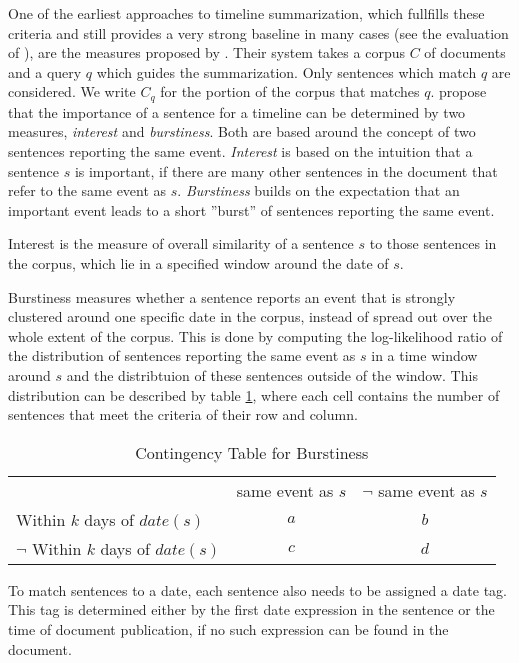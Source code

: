 \documentclass[a4paper,BCOR=10mm]{report}
\numberwithin{lemma}{chapter}
\numberwithin{definition}{chapter}
\begin{document}
One of the earliest approaches to timeline summarization, which fullfills these criteria and still provides a very strong baseline in many cases (see the evaluation of \citet{markert}), are the measures proposed by \citet{chieu}.
Their system takes a corpus $C$ of documents and a query $q$ which guides the summarization. Only sentences which match $q$ are considered. We write $C_q$ for the portion of the corpus that matches $q$.
\citeauthor{chieu} propose that the importance of a sentence for a timeline can be determined by two measures, \textit{interest} and \textit{burstiness}.
Both are based around the concept of two sentences reporting the same event. \textit{Interest} is based on the intuition that a sentence $s$ is important, if there are many other sentences in the document that refer to the same event as $s$. \textit{Burstiness} builds on the expectation that an important event leads to a short ''burst'' of sentences reporting the same event.

Interest is the measure of overall similarity of a sentence $s$ to those sentences in the corpus, which lie in a specified window around the date of $s$.

Burstiness measures whether a sentence reports an event that is strongly clustered around one specific date in the corpus, instead of spread out over the whole extent of the corpus. This is done by computing the log-likelihood ratio of the distribution of sentences reporting the same event as $s$ in a time window around $s$ and the distribtuion of these sentences outside of the window.
This distribution can be described by table \ref{tab:chieu}, where each cell contains the number of sentences that meet the criteria of their row and column.

\begin{table}
\begin{tabular}{|l|c|c|}
& same event as $s$ & $\lnot$ same event as $s$ \\
Within $k$ days of $\mathit{date}(s)$ & $a$ & $b$ \\
$\lnot$ Within $k$ days of $\mathit{date}(s)$ & $c$ & $d$
\end{tabular}
\caption{Contingency Table for Burstiness}
\label{tab:chieu}
\end{table}

To match sentences to a date, each sentence also needs to be assigned a date tag. This tag is determined either by the first date expression in the sentence or the time of document publication, if no such expression can be found in the document.
\end{document}
